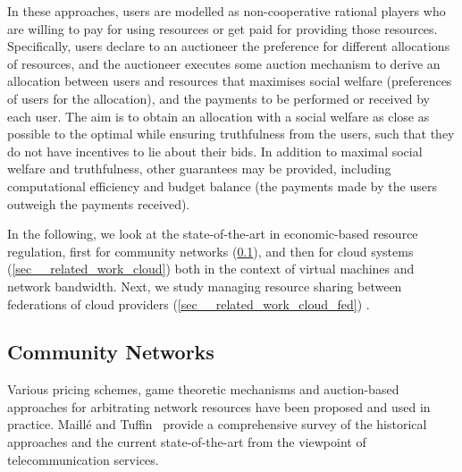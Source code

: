 In these approaches, users are modelled as non-cooperative rational
players who are willing to pay for using resources or get paid for
providing those resources. Specifically, users declare to an
auctioneer the preference for different allocations of resources, and
the auctioneer executes some auction mechanism to derive an allocation
between users and resources that maximises social welfare (preferences of users for the allocation),
and the payments to be performed or received by each user. 
The aim is to obtain an allocation with a social welfare as close as
possible to the optimal while ensuring truthfulness from the
users, such that they do not have incentives to lie about their bids. 
In addition to maximal social welfare and truthfulness, other guarantees may be provided,
including computational efficiency and budget balance 
(the payments made by the users outweigh the payments received).

In the following, we look at the state-of-the-art in economic-based resource regulation,
first for community networks (\cref{sec__related_work_networks}), 
and then for cloud systems (\cref{sec__related_work_cloud}) 
both in the context of virtual machines %
and network bandwidth. %
Next, we study managing resource sharing between federations of cloud providers (\cref{sec__related_work_cloud_fed}) .


\subsection{Community Networks}
\label{sec__related_work_networks}

Various pricing schemes, game theoretic mechanisms and auction-based approaches
for arbitrating network resources have been proposed and used in practice.
Maillé and Tuffin~\cite{Maille2014} provide a comprehensive survey of the historical
approaches and the current state-of-the-art from the viewpoint of telecommunication services.

